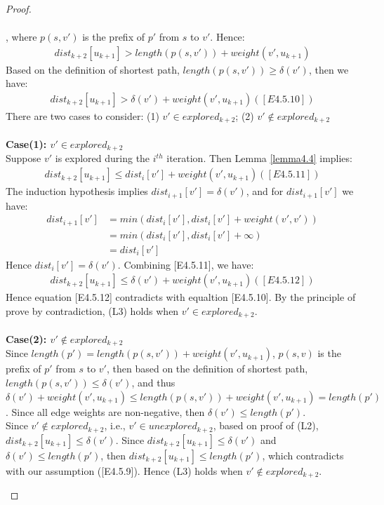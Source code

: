 \begin{proof}
\begin{itemize}
\begin{enumerate}
\begin{align*}
  \end{align*}
  , where $p(s, v')$ is the prefix of $p'$ from $s$ to $v'$. Hence: 
  \begin{align*}
   dist_{k+2}[u_{k+1}] > length(p(s, v')) + weight(v', u_{k+1}) 
  \end{align*}
  Based on the definition of shortest path, $length(p(s, v')) \geq \delta(v')$, then we have: 
  \begin{align*}
   dist_{k+2}[u_{k+1}] > \delta(v') + weight(v', u_{k+1}) ([E4.5.10])
  \end{align*}
  There are two cases to consider: (1) $v' \in explored_{k+2}$; (2) $v' \notin explored_{k+2}$
  \\\\
  \textbf{Case(1): $v' \in explored_{k+2}$}
  \\
  Suppose $v'$ is explored during the $i^{th}$ iteration. Then Lemma \ref{lemma4.4} implies: 
  \begin{align*}
    dist_{k+2}[u_{k+1}] \leq dist_i[v'] + weight(v', u_{k+1}) ([E4.5.11])
  \end{align*}
  The induction hypothesis implies $dist_{i+1}[v'] = \delta(v')$, and for $dist_{i+1}[v']$ we have: 
  \begin{align*}
    dist_{i+1}[v'] &= min(dist_i[v'], dist_i[v'] + weight(v', v')) \\
                   &= min(dist_i[v'], dist_i[v'] + \infty) \\
                   &= dist_i[v']
  \end{align*}
  Hence $dist_i[v'] = \delta(v')$. Combining [E4.5.11], we have: 
  \begin{align*}
    dist_{k+2}[u_{k+1}] \leq \delta(v') + weight(v', u_{k+1}) ([E4.5.12])
  \end{align*}
  Hence equation [E4.5.12] contradicts with equaltion [E4.5.10]. By the principle of prove by contradiction, (L3) holds when $v' \in explored_{k+2}$. 
  \\\\
  \textbf{Case(2): $v' \notin explored_{k+2}$}
  \\
  Since $length(p') = length(p(s, v')) + weight(v', u_{k+1})$, $p(s, v)$ is the prefix of $p'$ from $s$ to $v'$, then based on the definition of shortest path, $length(p(s, v')) \leq \delta(v')$, and thus $\delta(v') + weight(v', u_{k+1}) \leq length(p(s, v')) + weight(v', u_{k+1}) = length(p')$. Since all edge weights are non-negative, then $\delta(v') \leq length(p')$.
  \\
  Since $v' \notin explored_{k+2}$, i.e., $v' \in unexplored_{k+2}$, based on proof of (L2), $dist_{k+2}[u_{k+1}] \leq \delta(v')$. Since $dist_{k+2}[u_{k+1}] \leq \delta(v')$ and $\delta(v') \leq length(p')$, then $dist_{k+2}[u_{k+1}] \leq length(p')$, which contradicts with our assumption ([E4.5.9]). Hence (L3) holds when $v' \notin explored_{k+2}$. 

\end{enumerate}
\end{itemize}
\end{proof}
